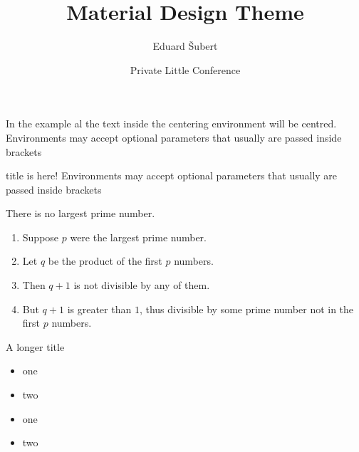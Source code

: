 \documentclass[aspectratio=169]{beamer}
\title{Material Design Theme}
\date[PLC]{Private Little Conference}
\author[Šubert]{Eduard Šubert}
\begin{document}
\begin{frame}
\titlepage
\end{frame}

\begin{frame}
\begin{multicols}{2}
  \begin{card}
  In the example al the text inside the centering environment will be centred. 
  \tcblower
  Environments may {\color{accentD}accept optional} parameters that usually are passed inside brackets
  \end{card}

  \begin{cardTitle}{title is here!}
  Environments may accept optional parameters that usually are passed inside brackets
  \end{cardTitle}
\end{multicols}
\end{frame}

\begin{frame} 
\begin{theorem}[tramtadada]
There is no largest prime number. 
\end{theorem} 
\begin{card}
\begin{enumerate} 
\item Suppose $p$ were the largest prime number. 
\item Let $q$ be the product of the first $p$ numbers. 
\item Then $q+1$ is not divisible by any of them. 
\item But $q + 1$ is greater than $1$, thus divisible by some prime
number not in the first $p$ numbers.
\end{enumerate}
\end{card}
\end{frame}

\begin{frame}{A longer title}
\begin{card}
\begin{itemize}
\item one
\item two
\end{itemize}
\begin{itemize}
\item one
\item two
\end{itemize}
\end{card}
\end{frame}
\end{document}
